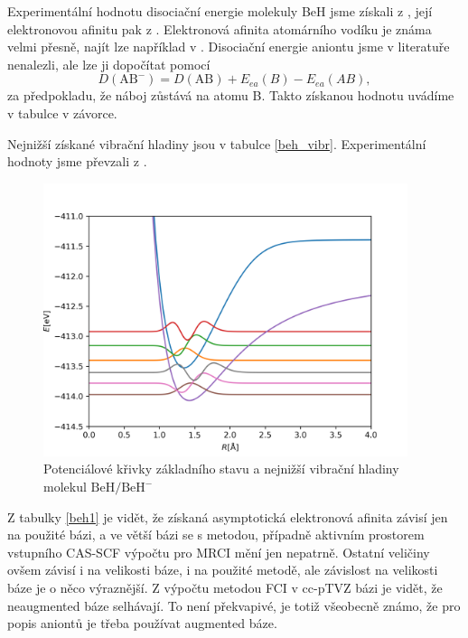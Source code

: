 Experimentální hodnotu disociační energie molekuly BeH jsme získali 
z \cite{BeH-LeRoy}, její elektronovou afinitu pak z \cite{BeH-ElAf}. Elektronová 
afinita atomárního vodíku je známa velmi přesně, 
najít lze například v \cite{H-ElAf}. Disociační energie aniontu jsme 
v literatuře nenalezli, ale
lze ji dopočítat pomocí
\begin{equation}
D(\mathrm{AB^-}) = D(\mathrm{AB}) + E_{ea}(B) - E_{ea}(AB), \label{eq_andiss}
\end{equation}
za předpokladu, že náboj zůstává na atomu B. Takto získanou hodnotu uvádíme v tabulce v závorce.

Nejnižší získané vibrační hladiny jsou v tabulce \ref{beh_vibr}.
Experimentální hodnoty jsme převzali z \cite{BeH-LeRoy}.
   
\begin{figure}
\centering
\includegraphics[width=0.95\textwidth]{../img/BeH-vibr1.png}
\caption{Potenciálové křivky základního stavu a nejnižší vibrační hladiny molekul $\mathrm{BeH/BeH^-}$}
\label{VibrBeH1}
\end{figure}
Z tabulky \ref{beh1} je vidět, že získaná asymptotická elektronová afinita závisí jen 
na použité bázi, a ve větší bázi se s metodou, případně aktivním prostorem vstupního 
CAS-SCF 
výpočtu pro MRCI mění jen nepatrně. Ostatní veličiny ovšem závisí i na velikosti báze, 
i na použité metodě, ale závislost na velikosti báze je o něco výraznější.
Z výpočtu metodou FCI v cc-pTVZ bázi je vidět, že neaugmented báze selhávají. To není 
překvapivé, je totiž všeobecně známo, že pro popis aniontů je třeba používat augmented 
báze.

